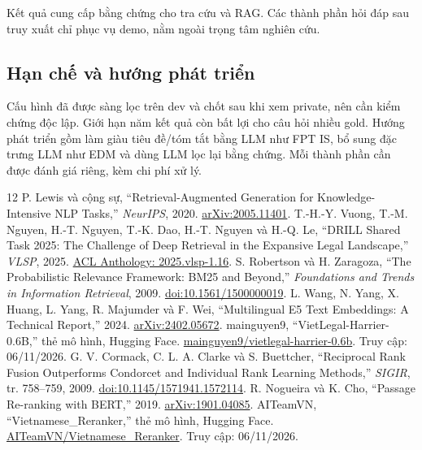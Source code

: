 \documentclass[12pt,a4paper]{article}
\begin{document}
Kết quả cung cấp bằng chứng cho tra cứu và RAG. Các thành phần hỏi đáp sau truy xuất chỉ phục vụ demo, nằm ngoài trọng tâm nghiên cứu.
\subsection{Hạn chế và hướng phát triển}\label{sec:limits}
Cấu hình đã được sàng lọc trên dev và chốt sau khi xem private, nên cần kiểm chứng độc lập. Giới hạn năm kết quả còn bất lợi cho câu hỏi nhiều gold. Hướng phát triển gồm làm giàu tiêu đề/tóm tắt bằng LLM như FPT IS, bổ sung đặc trưng LLM như EDM và dùng LLM lọc lại bằng chứng. Mỗi thành phần cần được đánh giá riêng, kèm chi phí xử lý.
\clearpage
{}
\begingroup\small\raggedright\setlength{\parskip}{0pt}
\begin{thebibliography}{12}\setlength{\itemsep}{5pt}
 P. Lewis và cộng sự, ``Retrieval-Augmented Generation for Knowledge-Intensive NLP Tasks,'' \textit{NeurIPS}, 2020. \href{https://arxiv.org/abs/2005.11401}{arXiv:2005.11401}.
 T.-H.-Y. Vuong, T.-M. Nguyen, H.-T. Nguyen, T.-K. Dao, H.-T. Nguyen và H.-Q. Le, ``DRILL Shared Task 2025: The Challenge of Deep Retrieval in the Expansive Legal Landscape,'' \textit{VLSP}, 2025. \href{https://aclanthology.org/2025.vlsp-1.16/}{ACL Anthology: 2025.vlsp-1.16}.
 S. Robertson và H. Zaragoza, ``The Probabilistic Relevance Framework: BM25 and Beyond,'' \textit{Foundations and Trends in Information Retrieval}, 2009. \href{https://doi.org/10.1561/1500000019}{doi:10.1561/1500000019}.
 L. Wang, N. Yang, X. Huang, L. Yang, R. Majumder và F. Wei, ``Multilingual E5 Text Embeddings: A Technical Report,'' 2024. \href{https://arxiv.org/abs/2402.05672}{arXiv:2402.05672}.
 mainguyen9, ``VietLegal-Harrier-0.6B,'' thẻ mô hình, Hugging Face. \href{https://huggingface.co/mainguyen9/vietlegal-harrier-0.6b}{mainguyen9/vietlegal-harrier-0.6b}. Truy cập: 06/11/2026.
 G. V. Cormack, C. L. A. Clarke và S. Buettcher, ``Reciprocal Rank Fusion Outperforms Condorcet and Individual Rank Learning Methods,'' \textit{SIGIR}, tr. 758--759, 2009. \href{https://doi.org/10.1145/1571941.1572114}{doi:10.1145/1571941.1572114}.
 R. Nogueira và K. Cho, ``Passage Re-ranking with BERT,'' 2019. \href{https://arxiv.org/abs/1901.04085}{arXiv:1901.04085}.
 AITeamVN, ``Vietnamese\_Reranker,'' thẻ mô hình, Hugging Face. \href{https://huggingface.co/AITeamVN/Vietnamese_Reranker}{AITeamVN/Vietnamese\_Reranker}. Truy cập: 06/11/2026.

\end{thebibliography}
\end{document}
